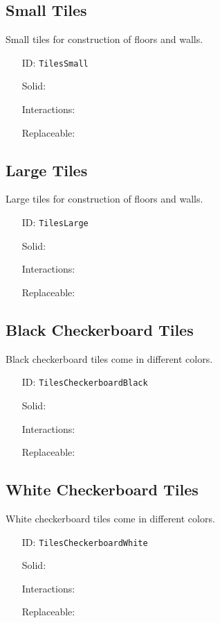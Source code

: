\subsection{Small Tiles}\label{subsec:blocks_small tiles}
Small tiles for construction of floors and walls.
\newline
\begin{itemize}[nosep]
    \item[ID:] \texttt{TilesSmall}
    \item[Solid:]  \Checkmark \item[Interactions:]  \XSolidBrush \item[Replaceable:]  \XSolidBrush
\end{itemize}

\subsection{Large Tiles}\label{subsec:blocks_large tiles}
Large tiles for construction of floors and walls.
\newline
\begin{itemize}[nosep]
    \item[ID:] \texttt{TilesLarge}
    \item[Solid:]  \Checkmark \item[Interactions:]  \XSolidBrush \item[Replaceable:]  \XSolidBrush
\end{itemize}

\subsection{Black Checkerboard Tiles}\label{subsec:blocks_black checkerboard tiles}
Black checkerboard tiles come in different colors.
\newline
\begin{itemize}[nosep]
    \item[ID:] \texttt{TilesCheckerboardBlack}
    \item[Solid:]  \Checkmark \item[Interactions:]  \Checkmark \item[Replaceable:]  \XSolidBrush
\end{itemize}

\subsection{White Checkerboard Tiles}\label{subsec:blocks_white checkerboard tiles}
White checkerboard tiles come in different colors.
\newline
\begin{itemize}[nosep]
    \item[ID:] \texttt{TilesCheckerboardWhite}
    \item[Solid:]  \Checkmark \item[Interactions:]  \Checkmark \item[Replaceable:]  \XSolidBrush
\end{itemize}

